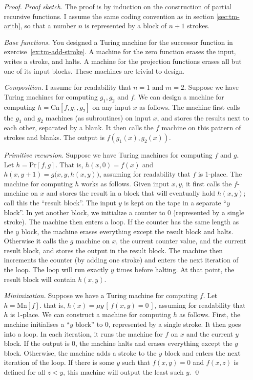 \begin{proof}
  \emph{Proof sketch.}
  The proof is by induction on the construction of partial recursive functions.
  I assume the same coding convention as in section \ref{sec:tm-arith},
  so that a number $n$ is represented by a block of $n+1$ strokes.

  \emph{Base functions.}
  You designed a Turing machine for the successor function in exercise~\ref{ex:tm-add-stroke}.
  A machine for the zero function erases the input,
  writes a stroke, and halts.
  A machine for the projection functions erases all but one of its input blocks.
  These machines are trivial to design.

  \emph{Composition.}
  I assume for readability that $n=1$ and $m=2$.
  Suppose we have Turing machines for computing $g_1, g_2$ and $f$.
  We can design a machine for computing
  $h = \mathrm{Cn}[f,g_1,g_2]$ on any input $x$ as follows.
  The machine first calls the $g_1$ and $g_2$ machines (as subroutines) on input $x$,
  and stores the results next to each other, separated by a blank.
  It then calls the $f$ machine on this pattern of strokes and blanks.
  The output is $f(g_1(x), g_2(x))$.

  \emph{Primitive recursion.}
  Suppose we have Turing machines for computing $f$ and $g$.
  Let $h = \mathrm{Pr}[f,g]$.
  That is, $h(x,0)=f(x)$ and $h(x,y{+}1)=g\big(x,y,h(x,y)\big)$,
  assuming for readability that $f$ is 1-place.
  The machine for computing $h$ works as follows.
  Given input $x,y$,
  it first calls the $f$-machine on $x$ and stores the result in a block that will eventually hold $h(x,y)$;
  call this the ``result block''.
  The input $y$ is kept on the tape in a separate ``$y$ block''.
  In yet another block, we initialize a counter to $0$ (represented by a single stroke).
  The machine then enters a loop.
  If the counter has the same length as the $y$ block,
  the machine erases everything except the result block and halts.
  Otherwise it calls the $g$ machine on $x$, the current counter value, and the current result block,
  and stores the output in the result block.
  The machine then increments the counter (by adding one stroke)
  and enters the next iteration of the loop.
  The loop will run exactly $y$ times before halting.
  At that point,
  the result block will contain $h(x,y)$.

  \emph{Minimization.}
  Suppose we have a Turing machine for computing $f$.
  Let $h = \mathrm{Mn}[f]$.
  that is, $h(x)=\mu y\,[\,f(x,y)=0\,]$,
  assuming for readability that $h$ is 1-place. 
  We can construct a machine for computing $h$ as follows.
  First,
  the machine initialises a ``$y$ block'' to $0$, represented by a single stroke.
  It then goes into a loop.
  In each iteration,
  it runs the machine for $f$ on $x$ and the current $y$ block.
  If the output is $0$,
  the machine halts and erases everything except the $y$ block.
  Otherwise,
  the machine adds a stroke to the $y$ block
  and enters the next iteration of the loop.
  If there is some $y$ such that $f(x,y)=0$
  and $f(x,z)$ is defined for all $z<y$,
  this machine will output the least such $y$.
  \qed
\end{proof}

